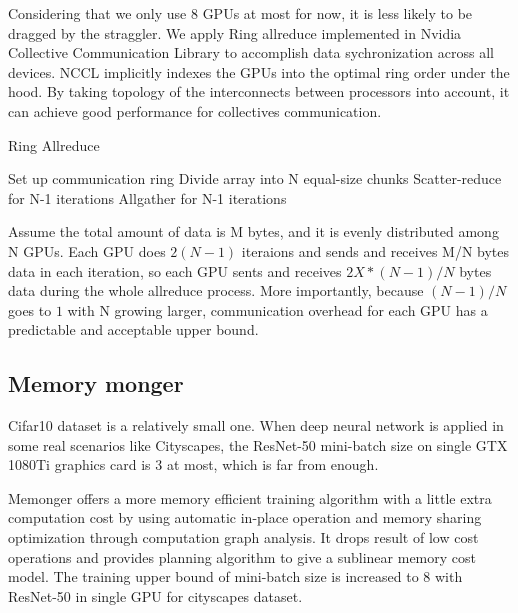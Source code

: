 Considering that we only use 8 GPUs at most for now, it is less likely to be dragged by the straggler. We apply Ring allreduce implemented in Nvidia Collective Communication Library\cite{jeaugey2017nccl} to accomplish data sychronization across all devices. NCCL implicitly indexes the GPUs into the optimal ring order under the hood. By taking topology of the interconnects between processors into account, it can achieve good performance for collectives communication.

\begin{algorithm}
    \caption{Ring Allreduce}
    \label{alg:ring-allreduce}
    \begin{algorithmic}[1]
        \State Set up communication ring
        \State Divide array into N equal-size chunks
        \State Scatter-reduce for N-1 iterations
        \State Allgather for N-1 iterations
    \end{algorithmic}
\end{algorithm}

Assume the total amount of data is M bytes, and it is evenly distributed among N GPUs. Each GPU does $2(N-1)$ iteraions and sends and receives M/N bytes data in each iteration, so each GPU sents and receives $2X*(N-1)/N$ bytes data during the whole allreduce process. More importantly, because $(N-1)/N$ goes to $1$ with N growing larger, communication overhead for each GPU has a predictable and acceptable upper bound.

\subsection{Memory monger}

Cifar10 dataset is a relatively small one. When deep neural network is applied in some real scenarios like Cityscapes,  the ResNet-50 mini-batch size on single GTX 1080Ti graphics card is 3 at most, which is far from enough. 

Memonger\cite{tianqichen-memonger} offers a more memory efficient training algorithm with a little extra computation cost by using automatic in-place operation and memory sharing optimization through computation graph analysis. It drops result of low cost operations and provides planning algorithm to give a sublinear memory cost model. The training upper bound of mini-batch size is increased to 8 with ResNet-50 in single GPU for cityscapes dataset.

